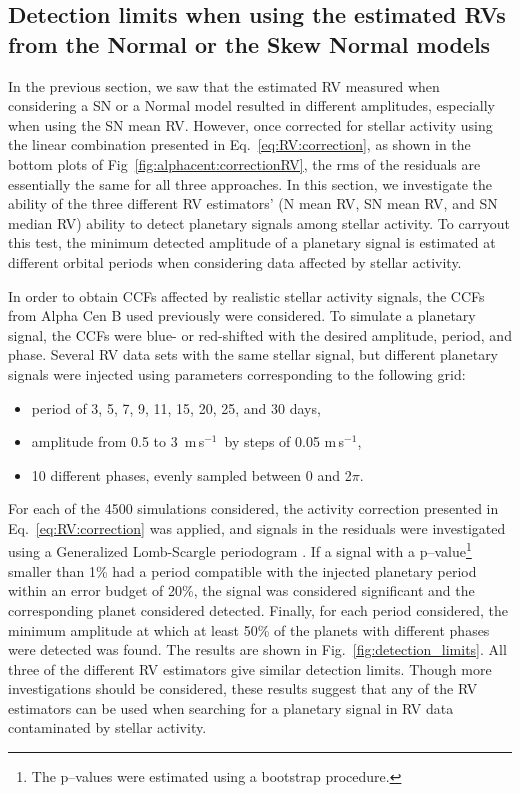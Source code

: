 \documentclass{aa}
\def\ms{\hbox{\,m\,s$^{-1}$}}         %
\begin{document}
\subsection{Detection limits when using the estimated RVs from the Normal or the Skew Normal models} \label{sec:detect_limits}

In the previous section, we saw that the estimated RV measured when considering a SN or a Normal model resulted in different amplitudes, especially when using the SN mean RV. However, once corrected for stellar activity using the linear combination presented in Eq.~\ref{eq:RV:correction}, as shown in the bottom plots of Fig~\ref{fig:alphacent:correctionRV}, the rms of the residuals are essentially the same for all three approaches.
In this section, we investigate the ability of the three different RV estimators' (N mean RV, SN mean RV, and SN median RV) ability to detect planetary signals among stellar activity.
To carryout this test, the minimum detected amplitude of a planetary signal is estimated at different orbital periods when considering data affected by stellar activity.

In order to obtain CCFs affected by realistic stellar activity signals, the CCFs from Alpha Cen B used previously were considered. 
To simulate a planetary signal, the CCFs were blue- or red-shifted with the desired amplitude, period, and phase.
Several RV data sets with the same stellar signal, but different planetary signals were injected using parameters corresponding to the following grid:
\begin{itemize}
\item period of 3, 5, 7, 9, 11, 15, 20, 25, and 30 days,
\item amplitude from 0.5 to 3 \ms\, by steps of 0.05\,\ms,
\item 10 different phases, evenly sampled between 0 and 2$\pi$.
\end{itemize}

For each of the 4500 simulations considered, the activity correction presented in Eq.~\ref{eq:RV:correction} was applied, and signals in the residuals were investigated using a Generalized Lomb-Scargle periodogram \citep[][]{Lomb-1976a, Scargle-1982, Zechmeister-2009}. 
If a signal with a p--value\footnote{The p--values were estimated using a bootstrap procedure.} smaller than 1\% had a period compatible with the injected planetary period within an error budget of 20\%, the signal was considered significant and the corresponding planet considered detected. 
Finally, for each period considered, the minimum amplitude at which at least 50\% of the planets with different phases were detected was found. The results are shown in Fig.~\ref{fig:detection_limits}. 
All three of the different RV estimators give similar detection limits. Though more investigations should be considered, these results suggest that any of the RV estimators can be used when searching for a planetary signal in RV data contaminated by stellar activity.
\end{document}
